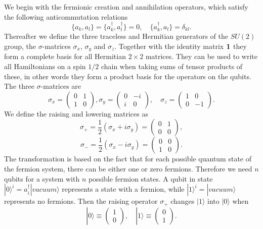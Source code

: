 \documentclass[aps,pra,twocolumn,floatfix]{revtex4}
\begin{document}
We begin with the  fermionic creation and annihilation operators, which satisfy the following
anticommutation relations
\begin{equation}
\label{eq:anticommutationrelations}
\{a_k, a_l\}=\{a_k^\dag, a_l^\dag\}= 0, \quad 
\{a_k^\dag, a_l\} = \delta_{kl}.
\end{equation}
Thereafter we define the three traceless and Hermitian generators of the $SU(2)$ group, the
$\sigma$-matrices $\sigma_x$, $\sigma_y$ and $\sigma_z$.  Together 
with the
identity matrix ${\bf 1}$ they form a complete basis for all Hermitian $2\times2$
matrices. They can be used to write all Hamiltonians on a spin $1/2$
chain when taking sums of tensor products of these, in other words  
they form a product basis for the operators on the qubits.
The three $\sigma$-matrices are
\begin{equation}
\sigma_x = \begin{pmatrix}
  0 & 1\\
  1 & 0 
\end{pmatrix},
\sigma_y = \begin{pmatrix}
  0 & -i\\
  i & 0 
\end{pmatrix}, \quad
\sigma_z = \begin{pmatrix}
  1 & 0\\
  0 & -1 
\end{pmatrix}.
\end{equation}
We define the raising and lowering matrices as
\[
\sigma_+ = \frac{1}{2}(\sigma_x + i\sigma_y)=
\begin{pmatrix}
  0 & 1\\
  0 & 0 
\end{pmatrix},
\]
\begin{equation}
\label{eq:raisingAndLowerin}
\sigma_- = \frac{1}{2}(\sigma_x - i\sigma_y)
=\begin{pmatrix}
  0 & 0\\
  1 & 0 
\end{pmatrix}.
\end{equation}
The transformation is based on the fact that for each possible
quantum state of the fermion system, there can be either one or zero
fermions. Therefore we need $n$ qubits for a system with $n$ possible
fermion states. A qubit in state $ |0\rangle ^i=a^\dag_i|vacuum\rangle$ 
represents a state with a
fermion, while $ |1\rangle ^i=|vacuum\rangle$ represents no fermions. Then the raising
operator $\sigma_+$ changes $ |1\rangle $ into $ |0\rangle $ when
\begin{equation}
 |0\rangle  \equiv \begin{pmatrix} 1 \\ 0 \end{pmatrix}, \quad
 |1\rangle  \equiv \begin{pmatrix} 0 \\ 1 \end{pmatrix}.
\end{equation}  
\end{document}

